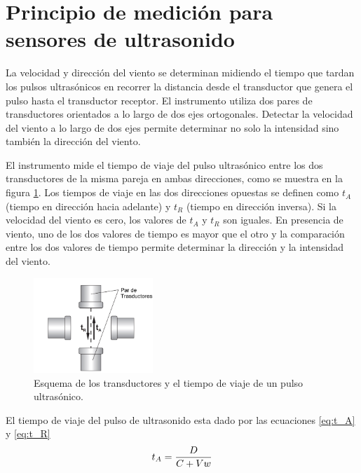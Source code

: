 \section{Principio de medición para sensores de ultrasonido}\label{ap:principioDeMedicionUltrasonido}

La velocidad y dirección del viento se determinan midiendo el tiempo que tardan los pulsos ultrasónicos en recorrer la distancia desde el transductor que genera el pulso hasta el transductor receptor. El instrumento utiliza dos pares de transductores orientados a lo largo de dos ejes ortogonales. Detectar la velocidad del viento a lo largo de dos ejes permite determinar no solo la intensidad sino también la dirección del viento.

El instrumento mide el tiempo de viaje del pulso ultrasónico entre los dos transductores de la misma pareja en ambas direcciones, como se muestra en la figura \ref{fig:trasductoresUltra}. Los tiempos de viaje en las dos direcciones opuestas se definen como $t_{A}$ (tiempo en dirección hacia adelante) y $t_{R}$ (tiempo en dirección inversa). Si la velocidad del viento es cero, los valores de $t_{A}$ y $t_{R}$ son iguales. En presencia de viento, uno de los dos valores de tiempo es mayor que el otro y la comparación entre los dos valores de tiempo permite determinar la dirección y la intensidad del viento.

\begin{figure}[H]
  \centering
  \includegraphics[width=0.4\textwidth]{Figuras/apendiceA/trasductoresUltra.png}
  \caption{Esquema de los transductores y el tiempo de viaje de un pulso ultrasónico. \cite{DeltaOHM_HD51.3D_manual}}
  \label{fig:trasductoresUltra}
\end{figure}

El tiempo de viaje del pulso de ultrasonido esta dado por las ecuaciones \ref{eq:t_A} y \ref{eq:t_R}
\begin{equation}
  t_{A} = \frac{D}{C + Vw}
  \centering
  \label{eq:t_A}
\end{equation}

